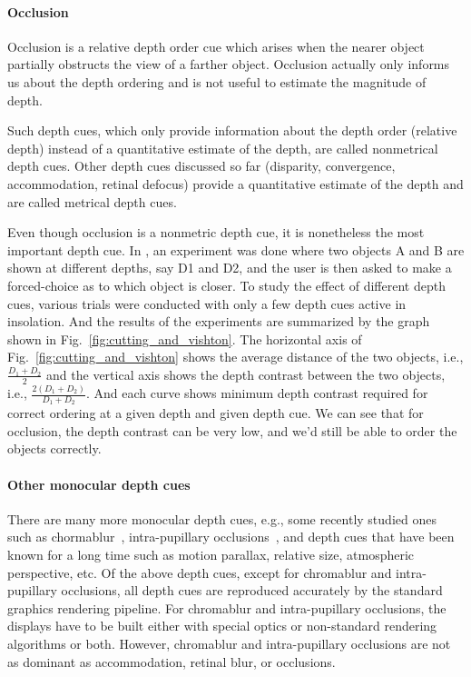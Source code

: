 \paragraph{Occlusion} Occlusion is a relative depth order cue which arises when the nearer object partially obstructs the view of a farther object. 
Occlusion actually only informs us about the depth ordering and is not useful to estimate the magnitude of depth. 

Such depth cues, which only provide information about the depth order (relative depth) instead of a quantitative estimate of the depth, are called nonmetrical depth cues. 
Other depth cues discussed so far (disparity, convergence, accommodation, retinal defocus) provide a quantitative estimate of the depth and are called metrical depth cues. 



Even though occlusion is a nonmetric depth cue, it is nonetheless the most important depth cue. 
In \cite{cutting1995perceiving}, an experiment was done where two objects A and B are shown at different depths, say D1 and D2, and the user is then asked to make a forced-choice as to which object is closer. 
To study the effect of different depth cues, various trials were conducted with only a few depth cues active in insolation. 
And the results of the experiments are summarized by the graph shown in Fig.~\ref{fig:cutting_and_vishton}. 
The horizontal axis of Fig.~\ref{fig:cutting_and_vishton} shows the average distance of the two objects, i.e., $\frac{D_1 + D_2}{2}$ and the vertical axis shows the depth contrast between the two objects, i.e., $\frac{2\left(D_1 + D_2\right)}{D_1 + D_2}$.
And each curve shows minimum depth contrast required for correct ordering at a given depth and given depth cue. 
We can see that for occlusion, the depth contrast can be very low, and we’d still be able to order the objects correctly. 

\paragraph{Other monocular depth cues} There are many more monocular depth cues, e.g., some recently studied ones such as chormablur~\cite{cholewiak2017chromablur}, intra-pupillary occlusions~\cite{zannoli2016blur}, and depth cues that have been known for a long time such as motion parallax, relative size, atmospheric perspective, etc. 
Of the above depth cues, except for chromablur and intra-pupillary occlusions, all depth cues are reproduced accurately by the standard graphics rendering pipeline. 
For chromablur and intra-pupillary occlusions, the displays have to be built either with special optics or non-standard rendering algorithms or both. 
However, chromablur and intra-pupillary occlusions are not as dominant as accommodation, retinal blur, or occlusions.

